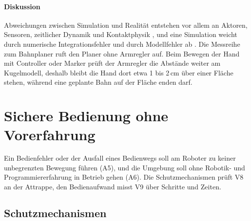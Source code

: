 \paragraph*{Diskussion}
Abweichungen zwischen Simulation und Realität entstehen vor allem an Aktoren, Sensoren, zeitlicher Dynamik und Kontaktphysik \cite{Collins2019}, und eine Simulation weicht durch numerische Integrationsfehler und durch Modellfehler ab \cite{Erez2015}.
Die Messreihe zum Bahnplaner ruft den Planer ohne Armregler auf.
Beim Bewegen der Hand mit Controller oder Marker prüft der Armregler die Abstände weiter am Kugelmodell, deshalb bleibt die Hand dort etwa 1 bis 2\,cm über einer Fläche stehen, während eine geplante Bahn auf der Fläche enden darf.

\section{Sichere Bedienung ohne Vorerfahrung}
\label{sec:eval_f3}
Ein Bedienfehler oder der Ausfall eines Bedienwegs soll am Roboter zu keiner unbegrenzten Bewegung führen (A5), und die Umgebung soll ohne Robotik- und Programmiererfahrung in Betrieb gehen (A6).
Die Schutzmechanismen prüft V8 an der Attrappe, den Bedienaufwand misst V9 über Schritte und Zeiten.

\subsection{Schutzmechanismen}
\label{sec:eval_sicherheit}

